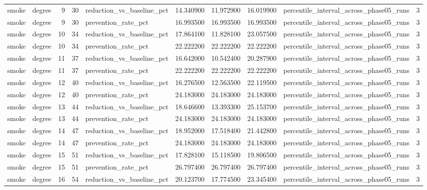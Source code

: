 \begin{tabular}{llrrlrrrlr}
smoke & degree & 9 & 30 & reduction\_vs\_baseline\_pct & 14.340900 & 11.972900 & 16.019900 & percentile\_interval\_across\_phase05\_runs & 3 \\
smoke & degree & 9 & 30 & prevention\_rate\_pct & 16.993500 & 16.993500 & 16.993500 & percentile\_interval\_across\_phase05\_runs & 3 \\
smoke & degree & 10 & 34 & reduction\_vs\_baseline\_pct & 17.864100 & 11.828100 & 23.057500 & percentile\_interval\_across\_phase05\_runs & 3 \\
smoke & degree & 10 & 34 & prevention\_rate\_pct & 22.222200 & 22.222200 & 22.222200 & percentile\_interval\_across\_phase05\_runs & 3 \\
smoke & degree & 11 & 37 & reduction\_vs\_baseline\_pct & 16.642000 & 10.542400 & 20.287900 & percentile\_interval\_across\_phase05\_runs & 3 \\
smoke & degree & 11 & 37 & prevention\_rate\_pct & 22.222200 & 22.222200 & 22.222200 & percentile\_interval\_across\_phase05\_runs & 3 \\
smoke & degree & 12 & 40 & reduction\_vs\_baseline\_pct & 16.276500 & 12.563500 & 22.119500 & percentile\_interval\_across\_phase05\_runs & 3 \\
smoke & degree & 12 & 40 & prevention\_rate\_pct & 24.183000 & 24.183000 & 24.183000 & percentile\_interval\_across\_phase05\_runs & 3 \\
smoke & degree & 13 & 44 & reduction\_vs\_baseline\_pct & 18.646600 & 13.393300 & 25.153700 & percentile\_interval\_across\_phase05\_runs & 3 \\
smoke & degree & 13 & 44 & prevention\_rate\_pct & 24.183000 & 24.183000 & 24.183000 & percentile\_interval\_across\_phase05\_runs & 3 \\
smoke & degree & 14 & 47 & reduction\_vs\_baseline\_pct & 18.952000 & 17.518400 & 21.442800 & percentile\_interval\_across\_phase05\_runs & 3 \\
smoke & degree & 14 & 47 & prevention\_rate\_pct & 24.183000 & 24.183000 & 24.183000 & percentile\_interval\_across\_phase05\_runs & 3 \\
smoke & degree & 15 & 51 & reduction\_vs\_baseline\_pct & 17.828100 & 15.118500 & 19.806500 & percentile\_interval\_across\_phase05\_runs & 3 \\
smoke & degree & 15 & 51 & prevention\_rate\_pct & 26.797400 & 26.797400 & 26.797400 & percentile\_interval\_across\_phase05\_runs & 3 \\
smoke & degree & 16 & 54 & reduction\_vs\_baseline\_pct & 20.123700 & 17.774500 & 23.345400 & percentile\_interval\_across\_phase05\_runs & 3 \\

\end{tabular}

